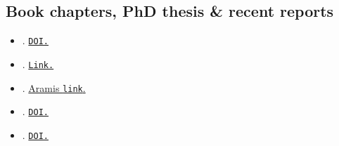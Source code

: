  \subsection{Book chapters, PhD thesis \& recent reports}
 \begin{itemize}[leftmargin=2.75cm,itemsep=2pt]

   \item{}. \href{https://doi.org/10.17605/OSF.IO/Z5R26}{\texttt{DOI.}}
\item{}. \href{https://www.economicswebinstitute.org/books/ssh-contributions%20to%20the%20energy%20research%20debate-a4.pdf}{\texttt{Link.}}
\item{}. \href{https://aramis.admin.ch/Texte/?ProjectID=41021}{Aramis \texttt{link}.}
 \item{}. \href{https://www.doi.org/10.3929/ethz-b-000476614}{\texttt{DOI.}}
 \item{}. \href{https://www.doi.org/10.3929/ethz-b-000512355}{\texttt{DOI.}}
  
\end{itemize}